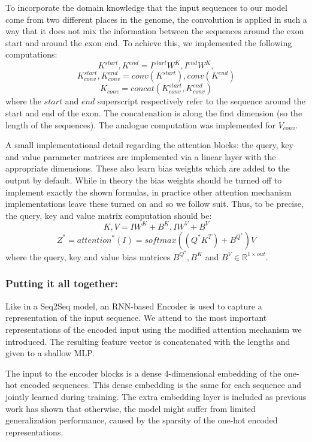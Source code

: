 To incorporate the domain knowledge that the input sequences to our model come from two different places in the genome, the convolution is applied in such a way that it does not mix the information between the sequences around the exon start and around the exon end. To achieve this, we implemented the following computations:
$$K^{start}, K^{end} = I^{start}W^K, I^{end}W^K,$$
$$K^{start}_{conv}, K^{end}_{conv} = conv(K^{start}), conv(K^{end})$$
$$K_{conv} = concat(K^{start}_{conv}, K^{end}_{conv})$$
where the $start$ and $end$ superscript respectively refer to the sequence around the start and end of the exon. The concatenation is along the first dimension (so the length of the sequences). The analogue computation was implemented for $V_{conv}$.


A small implementational detail regarding the attention blocks: the query, key and value parameter matrices are implemented via a linear layer with the appropriate dimensions. These also learn bias weights which are added to the output by default. While in theory the bias weights should be turned off to implement exactly the shown formulas, in practice other attention mechanism implementations leave these turned on \cite{annotatedtransformer} and so we follow suit. Thus, to be precise, the query, key and value matrix computation should be:
$$K, V = IW^K + B^K, IW^V + B^V$$
$$Z^* = {attention}^*(I) = softmax(({Q}^*K^T)+B^{Q^*})V$$
where the query, key and value bias matrices $B^{Q^*}, B^K$ and $B^V \in \mathbb{R}^{1 \times out}$.

\subsubsection{Putting it all together:} 
Like in a Seq2Seq model, an RNN-based Encoder is used to capture a representation of the input sequence. We attend to the most important representations of the encoded input using the modified attention mechanism we introduced. The resulting feature vector is concatenated with the lengths and given to a shallow MLP. 

The input to the encoder blocks is a dense 4-dimensional embedding of the one-hot encoded sequences. This dense embedding is the same for each sequence and jointly learned during training. The extra embedding layer is included as previous work \cite{embeddingneeded} has shown that otherwise, the model might suffer from limited generalization performance, caused by the sparsity of the one-hot encoded representations. 

